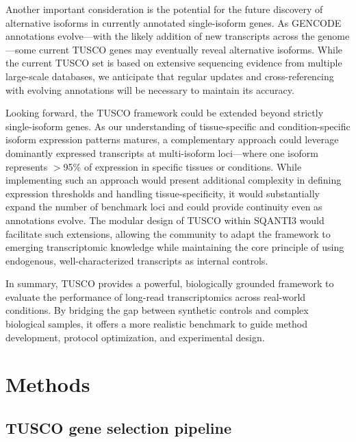\documentclass[pdflatex,sn-nature]{sn-jnl}%
\begin{document}
Another important consideration is the potential for the future discovery of alternative isoforms in currently annotated single-isoform genes. As GENCODE annotations evolve---with the likely addition of new transcripts across the genome---some current TUSCO genes may eventually reveal alternative isoforms. While the current TUSCO set is based on extensive sequencing evidence from multiple large-scale databases, we anticipate that regular updates and cross-referencing with evolving annotations will be necessary to maintain its accuracy.

Looking forward, the TUSCO framework could be extended beyond strictly single-isoform genes. As our understanding of tissue-specific and condition-specific isoform expression patterns matures, a complementary approach could leverage dominantly expressed transcripts at multi-isoform loci---where one isoform represents $>$95\% of expression in specific tissues or conditions. While implementing such an approach would present additional complexity in defining expression thresholds and handling tissue-specificity, it would substantially expand the number of benchmark loci and could provide continuity even as annotations evolve. The modular design of TUSCO within SQANTI3 would facilitate such extensions, allowing the community to adapt the framework to emerging transcriptomic knowledge while maintaining the core principle of using endogenous, well-characterized transcripts as internal controls.


In summary, TUSCO provides a powerful, biologically grounded framework to evaluate the performance of long-read transcriptomics across real-world conditions. By bridging the gap between synthetic controls and complex biological samples, it offers a more realistic benchmark to guide method development, protocol optimization, and experimental design.


\section{Methods}

\subsection{TUSCO gene selection pipeline}
\end{document}
